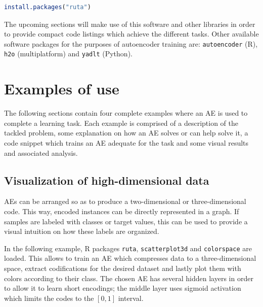 \documentclass[
	fontsize=11pt, %
	twoside=false, %
	open=any, %
	secnumdepth=1, %
]{kaobook}
\begin{document}
\begin{lstlisting}[language=R]
install.packages("ruta")
\end{lstlisting}

The upcoming sections will make use of this software and other libraries in order to provide compact code listings which achieve the different tasks. %
Other available software packages for the purposes of autoencoder training are: \texttt{autoencoder} (R), \texttt{h2o} (multiplatform) and \texttt{yadlt} (Python).

\section{Examples of use}
\label{sec.examples}

The following sections contain four complete examples where an AE is used to complete a learning task. Each example is comprised of a description of the tackled problem, some explanation on how an AE solves or can help solve it, a code snippet which trains an AE adequate for the task and some visual results and associated analysis.

\subsection{Visualization of high-dimensional data} %
\label{sec.visualization}

AEs can be arranged so as to produce a two-dimensional or three-dimensional code. This way, encoded instances can be directly represented in a graph. If samples are labeled with classes or target values, this can be used to provide a visual intuition on how these labels are organized. 

In the following example, R packages \texttt{ruta}, \texttt{scatterplot3d} and \texttt{colorspace} are loaded. This allows to train an AE which compresses data to a three-dimensional space, extract codifications for the desired dataset and lastly plot them with colors according to their class. The chosen AE has several hidden layers in order to allow it to learn short encodings; the middle layer uses sigmoid activation which limits the codes to the $[0,1]$ interval.
\end{document}
